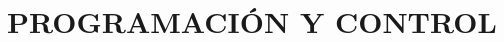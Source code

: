 \documentclass[../General.tex]{subfiles}
\begin{document}
\onehalfspacing
{}



\chapter{PROGRAMACIÓN Y CONTROL}


%

%

%

%

%




\end{document}
